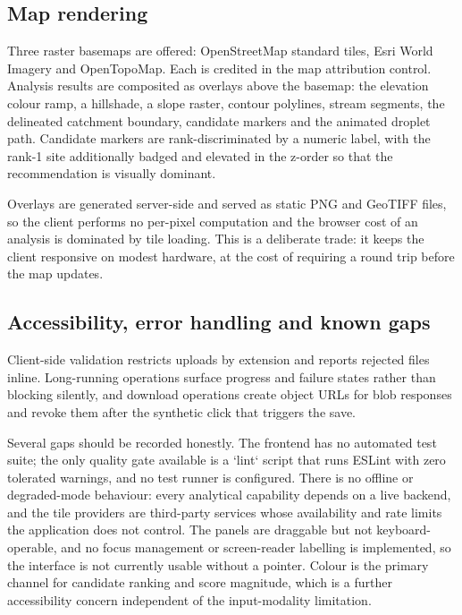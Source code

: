 \documentclass[sigconf,review,10pt]{acmart}
\begin{document}
\subsection{Map rendering}

Three raster basemaps are offered: OpenStreetMap standard tiles, Esri
World Imagery and OpenTopoMap. Each is credited in the map attribution
control. Analysis results are composited as overlays above the basemap:
the elevation colour ramp, a hillshade, a slope raster, contour
polylines, stream segments, the delineated catchment boundary, candidate
markers and the animated droplet path. Candidate markers are
rank-discriminated by a numeric label, with the rank-1 site additionally
badged and elevated in the z-order so that the recommendation is visually
dominant.

Overlays are generated server-side and served as static PNG and GeoTIFF
files, so the client performs no per-pixel computation and the browser
cost of an analysis is dominated by tile loading. This is a deliberate
trade: it keeps the client responsive on modest hardware, at the cost of
requiring a round trip before the map updates.

\subsection{Accessibility, error handling and known gaps}

Client-side validation restricts uploads by extension and reports
rejected files inline. Long-running operations surface progress and
failure states rather than blocking silently, and download operations
create object URLs for blob responses and revoke them after the synthetic
click that triggers the save.

Several gaps should be recorded honestly. The frontend has no automated
test suite; the only quality gate available is a `lint` script that runs
ESLint with zero tolerated warnings, and no test runner is configured.
There is no offline or degraded-mode behaviour: every analytical capability
depends on a live backend, and the tile providers are third-party
services whose availability and rate limits the application does not
control. The panels are draggable but not keyboard-operable, and no focus
management or screen-reader labelling is implemented, so the interface is
not currently usable without a pointer. Colour is the primary channel for
candidate ranking and score magnitude, which is a further accessibility
concern independent of the input-modality limitation.
\end{document}
